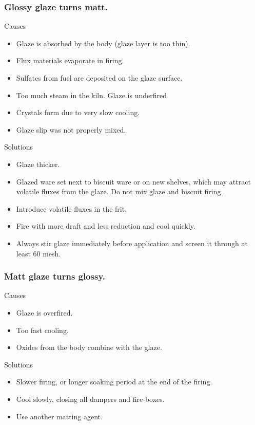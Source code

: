 \subsubsection{Glossy glaze turns matt.}
Causes
\begin{itemize}
\item Glaze is absorbed by the body (glaze layer is too thin).
\item Flux materials evaporate in firing.
\item Sulfates from fuel are deposited on the glaze surface.
\item Too much steam in the kiln. Glaze is underfired
\item Crystals form due to very slow cooling.
\item Glaze slip was not properly mixed.
\end{itemize}
Solutions
\begin{itemize}
\item Glaze thicker.
\item Glazed ware set next to biscuit ware or on new shelves, which may attract 
volatile fluxes from the glaze. Do not mix glaze and biscuit firing.
\item Introduce volatile fluxes in the frit.
\item Fire with more draft and less reduction and cool quickly.
\item Always stir glaze immediately before application and screen it through at 
least 60 mesh.
\end{itemize}
\subsubsection{Matt glaze turns glossy.}
Causes
\begin{itemize}
\item Glaze is overfired.
\item Too fast cooling.
\item Oxides from the body combine with the glaze.
\end{itemize}
Solutions
\begin{itemize}
\item Slower firing, or longer soaking period at the end of the firing.
\item Cool slowly, closing all dampers and fire-boxes.
\item Use another matting agent.
\end{itemize}
